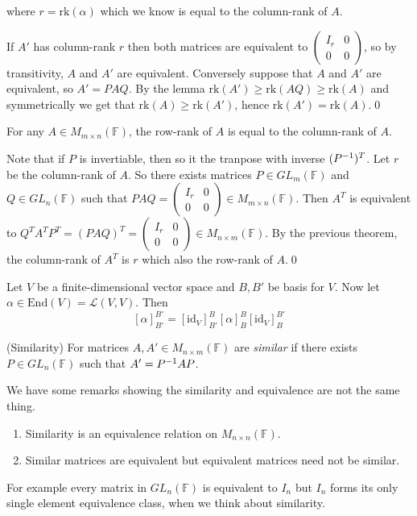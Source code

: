 \documentclass{article}
\newcommand{\F}{\mathbb{F}}
\newcommand{\rk}{\mathrm{rk}}
\begin{document}
where $ r=\rk(\alpha) $ which we know is equal to the column-rank of $ A $.\par
If $ A' $ has column-rank $ r $ then both matrices are equivalent to $ \begin{pmatrix}
	I_r&0\\0 &0
\end{pmatrix} $, so by transitivity, $ A $ and $ A' $ are equivalent. Conversely suppose that $ A $ and $ A' $ are equivalent, so $ A'=PAQ $. By the lemma $ \rk(A')\ge \rk(AQ)\ge\rk(A) $ and symmetrically we get that $ \rk(A)\ge \rk(A') $, hence $ \rk(A')=\rk(A) $.\qed
\begin{theorem}
	For any $ A\in M_{m\times n}(\F) $, the row-rank of $ A $ is equal to the column-rank of $ A $.
\end{theorem}
\pf Note that if $ P $ is invertiable, then so it the tranpose with inverse $ ({P}^{-1})^T $. Let $ r $ be the column-rank of $ A $. So there exists matrices $ P\in GL_m(\F) $ and $ Q\in GL_n(\F) $ such that $ PAQ=\begin{pmatrix}
	I_r&0\\ 0 & 0
\end{pmatrix}\in M_{m\times n}(\F) $. Then $ A^T $ is equivalent to $ Q^TA^TP^T=(PAQ)^T=\begin{pmatrix}
	I_r & 0 \\ 0 & 0
\end{pmatrix} \in M_{n\times m}(\F)$. By the previous theorem, the column-rank of $ A^T $ is $ r $ which also the row-rank of $ A $.\qed
\par
Let $ V $ be a finite-dimensional vector space and $ B,B' $ be basis for $ V $. Now let $ \alpha\in\mathrm{End}(V)=\mathcal L(V,V) $. Then
\[
	[\alpha]^{B'}_{B'}=[\mathrm{id}_V]^B_{B'}[\alpha]^B_B[\mathrm{id}_V]^{B'}_B
\]
\begin{definition}
	(Similarity) For matrices $ A,A'\in M_{n\times m}(\F) $ are \textit{similar} if there exists $ P\in GL_n(\F) $ such that $ A'={P}^{-1} AP $.
\end{definition}
\begin{remark}
We have some remarks showing the similarity and equivalence are not the same thing.
\begin{enumerate}
	\item Similarity is an equivalence relation on $ M_{n\times n}(\F) $.
	\item Similar matrices are equivalent but equivalent matrices need not be similar.
\end{enumerate}
For example every matrix in $ GL_n(\F) $ is equivalent to $ I_n $ but $ I_n $ forms its only single element equivalence class, when we think about similarity.
\end{remark}
\end{document}
